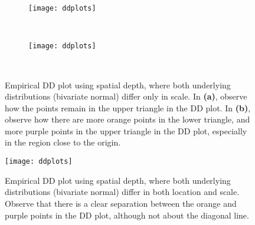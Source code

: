 \begin{figure}
    \centering
    \begin{subfigure}[b]{\textwidth}
        \centering
        \texttt{[image: ddplots]}
        \label{fig:ddplots_scale_a}
    \end{subfigure}
    \\[1em]
    \begin{subfigure}[b]{\textwidth}
        \centering
        \texttt{[image: ddplots]}
        \label{fig:ddplots_scale_b}
    \end{subfigure}
    \\[1em]
    \caption{
        Empirical DD plot using spatial depth, where both underlying
        distributions (bivariate normal) differ only in scale.
        In \textbf{(a)}, observe how the points remain in the upper triangle
        in the DD plot.
        In \textbf{(b)}, observe how there are more orange points in the lower
        triangle, and more purple points in the upper triangle in the DD plot,
        especially in the region close to the origin.
    }
    \label{fig:ddplots_scale}
\end{figure}



\begin{figure}
    \centering
    \texttt{[image: ddplots]}
    \caption{
        Empirical DD plot using spatial depth, where both underlying
        distributions (bivariate normal) differ in both location and scale.
        Observe that there is a clear separation between the orange and purple
        points in the DD plot, although not about the diagonal line.
    }
    \label{fig:ddplots_location_scale}
\end{figure}


